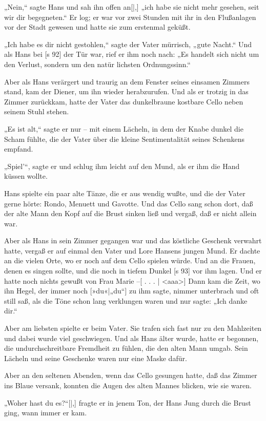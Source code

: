 „Nein,“ sagte Hans und sah ihn offen an[|,] „ich
habe sie nicht mehr gesehen, seit wir dir begegneten.“
Er log; er war vor zwei Stunden mit ihr in den
Flußanlagen vor der Stadt gewesen und hatte sie
zum erstenmal geküßt.

„Ich habe es dir nicht gestohlen,“ sagte der
Vater mürrisch, „gute Nacht.“ Und als Hans bei
[s 92]
der Tür war, rief er ihm noch nach: „Es handelt
sich nicht um den Verlust, sondern um den natür­
lichsten Ordnungssinn.“

Aber als Hans verärgert und traurig an dem
Fenster seines einsamen Zimmers stand, kam der
Diener, um ihn wieder herabzurufen. Und als er
trotzig in das Zimmer zurückkam, hatte der Vater
das dunkelbraune kostbare Cello neben seinem Stuhl
stehen.

„Es ist alt,“ sagte er nur – mit einem Lächeln,
in dem der Knabe dunkel die Scham fühlte, die der
Vater über die kleine Sentimentalität seines Schenkens
empfand.

„Spiel'“, sagte er und schlug ihm leicht auf den
Mund, als er ihm die Hand küssen wollte.

Hans spielte ein paar alte Tänze, die er aus­
wendig wußte, und die der Vater gerne hörte:
Rondo, Menuett und Gavotte. Und das Cello sang
schon dort, daß der alte Mann den Kopf auf die
Brust sinken ließ und vergaß, daß er nicht allein war.

Aber als Hans in sein Zimmer gegangen war
und das köstliche Geschenk verwahrt hatte, vergaß
er auf einmal den Vater und Lore Hansens jungen
Mund. Er dachte an die vielen Orte, wo er noch
auf dem Cello spielen würde. Und an die Frauen,
denen es singen sollte, und die noch in tiefem Dunkel
[s 93]
vor ihm lagen. Und er hatte noch nichts gewußt
von Frau Marie –[ . . .
|
<aaa>]
Dann kam die Zeit, wo ihn Hegel, der immer
noch [»du«|„du“] zu ihm sagte, nimmer unterbrach und
oft still saß, als die Töne schon lang verklungen
waren und nur sagte: „Ich danke dir.“

Aber am liebsten spielte er beim Vater. Sie
trafen sich fast nur zu den Mahlzeiten und dabei
wurde viel geschwiegen. Und als Hans älter wurde,
hatte er begonnen, die undurchschreitbare Fremdheit
zu fühlen, die den alten Mann umgab. Sein Lächeln
und seine Geschenke waren nur eine Maske dafür.

Aber an den seltenen Abenden, wenn das Cello
gesungen hatte, daß das Zimmer ins Blaue versank,
konnten die Augen des alten Mannes blicken, wie
sie waren.

„Woher hast du es?“[|,] fragte er in jenem Ton, der
Hans Jung durch die Brust ging, wann immer er kam.

